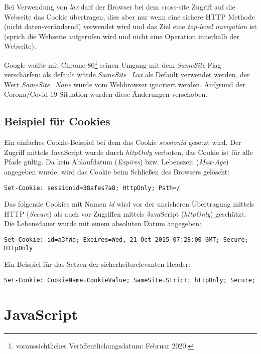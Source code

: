 Bei Verwendung von \textit{lax} darf der Browser bei dem cross-site Zugriff auf die Webseite das Cookie übertragen, dies aber nur wenn eine sichere HTTP Methode (nicht daten-verändernd) verwendet wird und das Ziel eine \textit{top-level navigation} ist (sprich die Webseite aufgerufen wird und nicht eine Operation innerhalb der Webseite).

Google wollte mit Chrome 80\footnote{voraussichtliches Veröffentlichungsdatum: Februar 2020.} seinen Umgang mit dem \textit{SameSite}-Flag verschärfen: als default würde \textit{SameSite=Lax} als Default verwendet werden, der Wert \textit{SameSite=None} würde vom Webbrowser ignoriert werden. Aufgrund der Corona/Covid-19 Situation wurden diese Änderungen verschoben.

\subsection{Beispiel für Cookies}

Ein einfaches Cookie-Beispiel bei dem das Cookie \textit{sessionid} gesetzt wird. Der Zugriff mittels JavaScript wurde durch \textit{httpOnly} verboten, das Cookie ist für alle Pfade gültig. Da kein Ablaufdatum (\textit{Expires}) bzw. Lebenszeit (\textit{Max-Age}) angegeben wurde, wird das Cookie beim Schließen des Browsers gelöscht:

\begin{verbatim}
Set-Cookie: sessionid=38afes7a8; HttpOnly; Path=/
\end{verbatim}

Das folgende Cookies mit Namen \textit{id} wird vor der unsicheren Übertragung mittels HTTP (\textit{Secure}) als auch vor Zugriffen mittels JavaScript (\textit{httpOnly}) geschützt. Die Lebensdauer wurde mit einem absoluten Datum angegeben:

\begin{verbatim}
Set-Cookie: id=a3fWa; Expires=Wed, 21 Oct 2015 07:28:00 GMT; Secure; HttpOnly
\end{verbatim}

Ein Beispiel für das Setzen der sicherheitsrelevanten Header:

\begin{verbatim}
Set-Cookie: CookieName=CookieValue; SameSite=Strict; httpOnly; Secure;
\end{verbatim}

\section{JavaScript}

